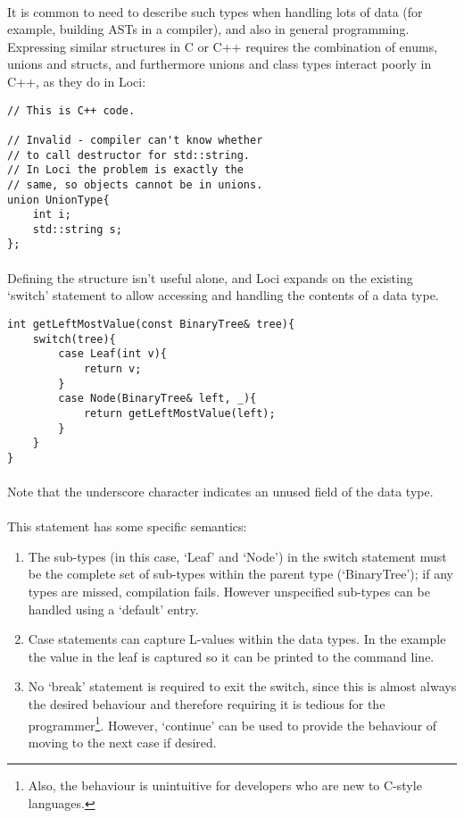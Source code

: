 \documentclass[12pt,twoside,notitlepage]{report}
\begin{document}
\paragraph{}
It is common to need to describe such types when handling lots of data (for example, building ASTs in a compiler), and also in general programming. Expressing similar structures in C or C++ requires the combination of enums, unions and structs, and furthermore unions and class types interact poorly in C++, as they do in Loci:

\begin{lstlisting}
// This is C++ code.

// Invalid - compiler can't know whether
// to call destructor for std::string.
// In Loci the problem is exactly the
// same, so objects cannot be in unions.
union UnionType{
	int i;
	std::string s;
};
\end{lstlisting}

\paragraph{}
Defining the structure isn't useful alone, and Loci expands on the existing `switch' statement to allow accessing and handling the contents of a data type.


\begin{lstlisting}
int getLeftMostValue(const BinaryTree& tree){
	switch(tree){
		case Leaf(int v){
			return v;
		}
		case Node(BinaryTree& left, _){
			return getLeftMostValue(left);
		}
	}
}
\end{lstlisting}

\paragraph{}
Note that the underscore character indicates an unused field of the data type.

\paragraph{}
This statement has some specific semantics:

\begin{enumerate}
\item The sub-types (in this case, `Leaf' and `Node') in the switch statement must be the complete set of sub-types within the parent type (`BinaryTree'); if any types are missed, compilation fails. However unspecified sub-types can be handled using a `default' entry.
\item Case statements can capture L-values within the data types. In the example the value in the leaf is captured so it can be printed to the command line.
\item No `break' statement is required to exit the switch, since this is almost always the desired behaviour and therefore requiring it is tedious for the programmer\footnote{Also, the behaviour is unintuitive for developers who are new to C-style languages.}. However, `continue' can be used to provide the behaviour of moving to the next case if desired.
\end{enumerate}
\end{document}
